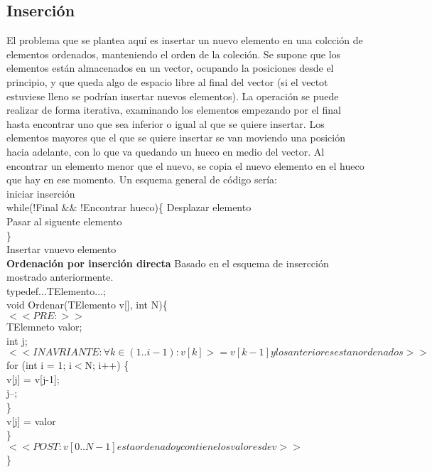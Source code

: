 \documentclass[11pt,a4paper]{article}
\begin{document}
  	\subsection{Inserción}
  	El problema que se plantea aquí es insertar un nuevo elemento en una colcción
  	de elementos ordenados, manteniendo el orden de la coleción. Se supone que
  	los elementos están almacenados en un vector, ocupando la posiciones desde
  	el principio, y que queda algo de espacio libre al final del vector (si el vectot
  	estuviese lleno se podrían insertar nuevos elementos).
  	La operación se puede realizar de forma iterativa, examinando los elementos empezando por el final hasta encontrar uno que sea inferior o igual al que se quiere insertar. Los elementos mayores que el que se quiere insertar se van
  	moviendo una posición hacia adelante, con lo que va quedando un hueco en medio del vector. Al encontrar un elemento menor que el nuevo, se copia el nuevo elemento en el hueco que hay en ese momento. Un esquema general de código sería:\\
  	iniciar inserción\\
  	while(!Final $\&\&$ !Encontrar hueco)\{
  	Desplazar elemento\\
  	Pasar al siguente elemento\\
  	\}\\
  	Insertar vnuevo elemento\\
  	\textbf{Ordenación por inserción directa} Basado en el esquema de insercción mostrado anteriormente.\\
  	typedef...TElemento...;\\
  	void Ordenar(TElemento v[], int N)\{\\
  	$<< PRE: >>$\\
  	TElemneto valor;\\
  	int j;\\
  	$<<INAVRIANTE : \forall k \in (1..i-1): v[k ]  >= v[k-1] y losanteriores estan ordenados >>$ \\
  	for (int i = 1; i$<$N; i++) \{\\
  	v[j] = v[j-1];\\
  	j--;\\
  	\}\\
  	v[j] = valor\\
  	\}\\
  	$<< POST: v[0..N-1] esta ordenado y contiene los valores de v >>$ \\
  	\}
\end{document}
